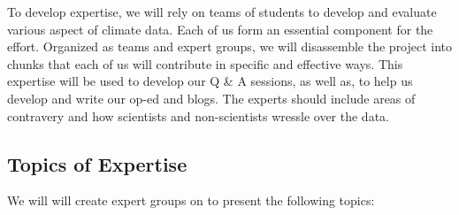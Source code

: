\documentclass{article}\usepackage[]{graphicx}\usepackage[]{color}
\begin{document}
To develop expertise, we will rely on teams of students to develop and evaluate various aspect of climate data. Each of us form an essential component for the effort. Organized as teams and expert groups, we will disassemble the project into chunks that each of us will contribute in specific and effective ways. This expertise will be used to develop our Q \& A sessions, as well as, to help us develop and write our op-ed and blogs. The experts should include areas of contravery and how scientists and non-scientists wressle over the data.

\subsection{Topics of Expertise}

We will will create expert groups on to present the following topics:
\end{document}
